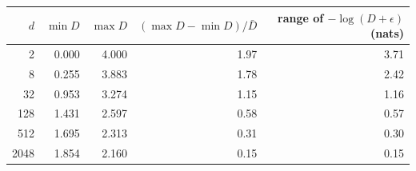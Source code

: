 \begin{tabular}{@{}rrrrr@{}}
\toprule
$d$ & $\min D$ & $\max D$ & $(\max D-\min D)/\bar{D}$ & range of $-\log(D+\epsilon)$ (nats) \\
\midrule
2 & 0.000 & 4.000 & 1.97 & 3.71 \\
8 & 0.255 & 3.883 & 1.78 & 2.42 \\
32 & 0.953 & 3.274 & 1.15 & 1.16 \\
128 & 1.431 & 2.597 & 0.58 & 0.57 \\
512 & 1.695 & 2.313 & 0.31 & 0.30 \\
2048 & 1.854 & 2.160 & 0.15 & 0.15 \\
\bottomrule
\end{tabular}
